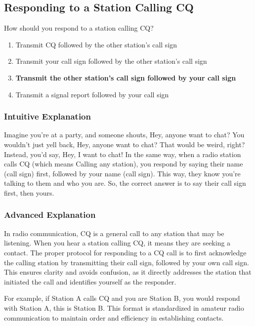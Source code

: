 \subsection{Responding to a Station Calling CQ}
\label{T2A05}

\begin{tcolorbox}[colback=gray!10!white,colframe=black!75!black,title=T2A05]
How should you respond to a station calling CQ?
\begin{enumerate}[label=\Alph*]
    \item Transmit CQ followed by the other station’s call sign
    \item Transmit your call sign followed by the other station’s call sign
    \item \textbf{Transmit the other station’s call sign followed by your call sign}
    \item Transmit a signal report followed by your call sign
\end{enumerate}
\end{tcolorbox}

\subsubsection{Intuitive Explanation}
Imagine you're at a party, and someone shouts, Hey, anyone want to chat? You wouldn't just yell back, Hey, anyone want to chat? That would be weird, right? Instead, you'd say, Hey, I want to chat! In the same way, when a radio station calls CQ (which means Calling any station), you respond by saying their name (call sign) first, followed by your name (call sign). This way, they know you're talking to them and who you are. So, the correct answer is to say their call sign first, then yours.

\subsubsection{Advanced Explanation}
In radio communication, CQ is a general call to any station that may be listening. When you hear a station calling CQ, it means they are seeking a contact. The proper protocol for responding to a CQ call is to first acknowledge the calling station by transmitting their call sign, followed by your own call sign. This ensures clarity and avoids confusion, as it directly addresses the station that initiated the call and identifies yourself as the responder. 

For example, if Station A calls CQ and you are Station B, you would respond with Station A, this is Station B. This format is standardized in amateur radio communication to maintain order and efficiency in establishing contacts. 

